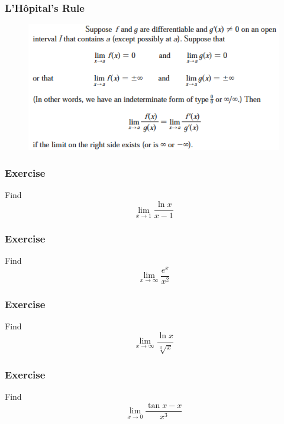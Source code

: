 \documentclass[xcolor=dvipsnames]{beamer}
\begin{document}
\begin{frame}
  \frametitle{L'H{\^o}pital's Rule}
\begin{figure}[h]
\includegraphics[scale=.6]{./diagrams/lhopital_ed.png}
\end{figure}
\end{frame}

\begin{frame}
  \frametitle{Exercise}
{\ubung} Find
\begin{equation}
  \label{eq:aimooshi}
  \lim_{x\rightarrow{}1}\frac{\ln{}x}{x-1}
\end{equation}
\end{frame}

\begin{frame}
  \frametitle{Exercise}
{\ubung} Find
\begin{equation}
  \label{eq:awaifeif}
  \lim_{x\rightarrow\infty}\frac{e^{x}}{x^{2}}
\end{equation}
\end{frame}

\begin{frame}
  \frametitle{Exercise}
  {\ubung} Find
  \begin{equation}
    \label{eq:ijieyoja}
    \lim_{x\rightarrow\infty}\frac{\ln{}x}{\sqrt[3]{x}}
  \end{equation}
\end{frame}

\begin{frame}
  \frametitle{Exercise}
  {\ubung} Find
  \begin{equation}
    \label{eq:iemohyua}
    \lim_{x\rightarrow{}0}\frac{\tan{}x-x}{x^{3}}
  \end{equation}
\end{frame}
\end{document}
